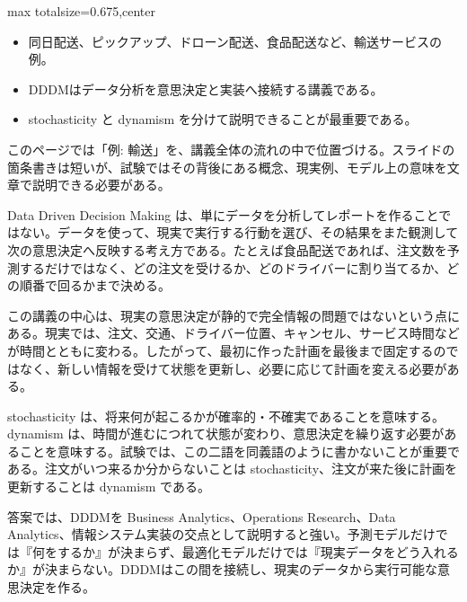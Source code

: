 \clearpage
{}
\begin{adjustbox}{max totalsize={\textwidth}{0.675\textheight},center}
\begin{minipage}{\textwidth}\scriptsize
\begin{minipage}[t]{0.485\textwidth}
\begin{itemize}
\item 同日配送、ピックアップ、ドローン配送、食品配送など、輸送サービスの例。
\end{itemize}
\begin{itemize}
\item DDDMはデータ分析を意思決定と実装へ接続する講義である。
\item stochasticity と dynamism を分けて説明できることが最重要である。
\end{itemize}
\end{minipage}\hfill
\begin{minipage}[t]{0.485\textwidth}
このページでは「例: 輸送」を、講義全体の流れの中で位置づける。スライドの箇条書きは短いが、試験ではその背後にある概念、現実例、モデル上の意味を文章で説明できる必要がある。\par
Data Driven Decision Making は、単にデータを分析してレポートを作ることではない。データを使って、現実で実行する行動を選び、その結果をまた観測して次の意思決定へ反映する考え方である。たとえば食品配送であれば、注文数を予測するだけではなく、どの注文を受けるか、どのドライバーに割り当てるか、どの順番で回るかまで決める。\par
この講義の中心は、現実の意思決定が静的で完全情報の問題ではないという点にある。現実では、注文、交通、ドライバー位置、キャンセル、サービス時間などが時間とともに変わる。したがって、最初に作った計画を最後まで固定するのではなく、新しい情報を受けて状態を更新し、必要に応じて計画を変える必要がある。\par
stochasticity は、将来何が起こるかが確率的・不確実であることを意味する。dynamism は、時間が進むにつれて状態が変わり、意思決定を繰り返す必要があることを意味する。試験では、この二語を同義語のように書かないことが重要である。注文がいつ来るか分からないことは stochasticity、注文が来た後に計画を更新することは dynamism である。\par
答案では、DDDMを Business Analytics、Operations Research、Data Analytics、情報システム実装の交点として説明すると強い。予測モデルだけでは『何をするか』が決まらず、最適化モデルだけでは『現実データをどう入れるか』が決まらない。DDDMはこの間を接続し、現実のデータから実行可能な意思決定を作る。\par

\end{minipage}
\end{minipage}
\end{adjustbox}

